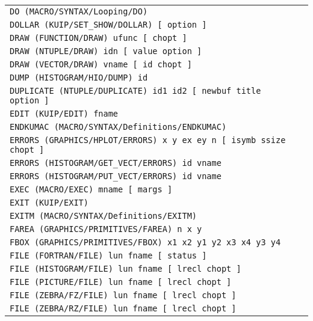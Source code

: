 \begin{longtable}{|>{\footnotesize\tt}lr|}
DO (MACRO/SYNTAX/Looping/DO)  & \pageref{ref:MACRO/SYNTAX/Looping/DO}\\ 
DOLLAR (KUIP/SET_SHOW/DOLLAR)  [ option ] & \pageref{ref:KUIP/SET_SHOW/DOLLAR}\\ 
DRAW (FUNCTION/DRAW)  ufunc [ chopt ] & \pageref{ref:FUNCTION/DRAW}\\ 
DRAW (NTUPLE/DRAW)  idn [ value option ] & \pageref{ref:NTUPLE/DRAW}\\ 
DRAW (VECTOR/DRAW)  vname [ id chopt ] & \pageref{ref:VECTOR/DRAW}\\ 
DUMP (HISTOGRAM/HIO/DUMP)  id & \pageref{ref:HISTOGRAM/HIO/DUMP}\\ 
DUPLICATE (NTUPLE/DUPLICATE)  id1 id2 [ newbuf title option ] & \pageref{ref:NTUPLE/DUPLICATE}\\ 
EDIT (KUIP/EDIT)  fname & \pageref{ref:KUIP/EDIT}\\ 
ENDKUMAC (MACRO/SYNTAX/Definitions/ENDKUMAC)  & \pageref{ref:MACRO/SYNTAX/Definitions/ENDKUMAC}\\ 
ERRORS (GRAPHICS/HPLOT/ERRORS)  x y ex ey n [ isymb ssize chopt ] & \pageref{ref:GRAPHICS/HPLOT/ERRORS}\\ 
ERRORS (HISTOGRAM/GET_VECT/ERRORS)  id vname & \pageref{ref:HISTOGRAM/GET_VECT/ERRORS}\\ 
ERRORS (HISTOGRAM/PUT_VECT/ERRORS)  id vname & \pageref{ref:HISTOGRAM/PUT_VECT/ERRORS}\\ 
EXEC (MACRO/EXEC)  mname [ margs ] & \pageref{ref:MACRO/EXEC}\\ 
EXIT (KUIP/EXIT)  & \pageref{ref:KUIP/EXIT}\\ 
EXITM (MACRO/SYNTAX/Definitions/EXITM)  & \pageref{ref:MACRO/SYNTAX/Definitions/EXITM}\\ 
FAREA (GRAPHICS/PRIMITIVES/FAREA)  n x y & \pageref{ref:GRAPHICS/PRIMITIVES/FAREA}\\ 
FBOX (GRAPHICS/PRIMITIVES/FBOX)  x1 x2 y1 y2 x3 x4 y3 y4 & \pageref{ref:GRAPHICS/PRIMITIVES/FBOX}\\ 
FILE (FORTRAN/FILE)  lun fname [ status ] & \pageref{ref:FORTRAN/FILE}\\ 
FILE (HISTOGRAM/FILE)  lun fname [ lrecl chopt ] & \pageref{ref:HISTOGRAM/FILE}\\ 
FILE (PICTURE/FILE)  lun fname [ lrecl chopt ] & \pageref{ref:PICTURE/FILE}\\ 
FILE (ZEBRA/FZ/FILE)  lun fname [ lrecl chopt ] & \pageref{ref:ZEBRA/FZ/FILE}\\ 
FILE (ZEBRA/RZ/FILE)  lun fname [ lrecl chopt ] & \pageref{ref:ZEBRA/RZ/FILE}\\ 

\end{longtable}
